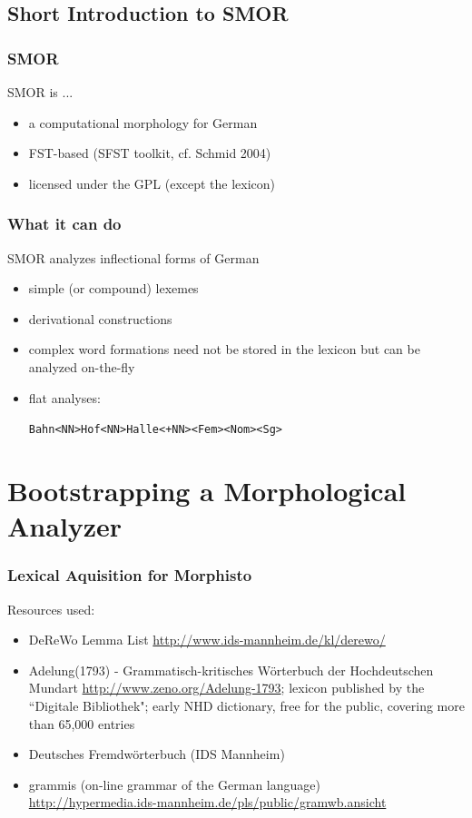 \documentclass {beamer}
\begin{document}
\subsection{Short Introduction to SMOR}
\frame
{
  \frametitle{SMOR}

SMOR is ...
  \begin{itemize}
  \item a computational morphology for German
  \item FST-based (SFST toolkit, cf. Schmid 2004)
  \item licensed under the GPL (except the lexicon)
  \end{itemize}
}

\frame
{
  \frametitle{What it can do}
SMOR analyzes inflectional forms of German
  \begin{itemize}
  \item<1->{simple (or compound) lexemes}
  \item<2->{derivational constructions}
  \item<3->{complex word formations need not be stored in the lexicon but can be analyzed on-the-fly}
  \item<4->{flat analyses:}
  \begin{alltt}
    Bahn<NN>Hof<NN>Halle<+NN><Fem><Nom><Sg>
  \end{alltt}
  \end{itemize}
}

\section{Bootstrapping a Morphological Analyzer}
\frame
{
  \frametitle{Lexical Aquisition for Morphisto}
Resources used:
\begin{itemize}
\item DeReWo Lemma List \url{http://www.ids-mannheim.de/kl/derewo/}
\item Adelung(1793) - Grammatisch-kritisches Wörterbuch der Hochdeutschen Mundart\newline 
\url{http://www.zeno.org/Adelung-1793}; lexicon published by the ``Digitale Bibliothek"; early NHD dictionary, free for the public, covering more than 65,000 entries
\item Deutsches Fremdwörterbuch (IDS Mannheim)
\item grammis (on-line grammar of the German language) \\
	\url{http://hypermedia.ids-mannheim.de/pls/public/gramwb.ansicht}
\end{itemize}
}
\end{document}
